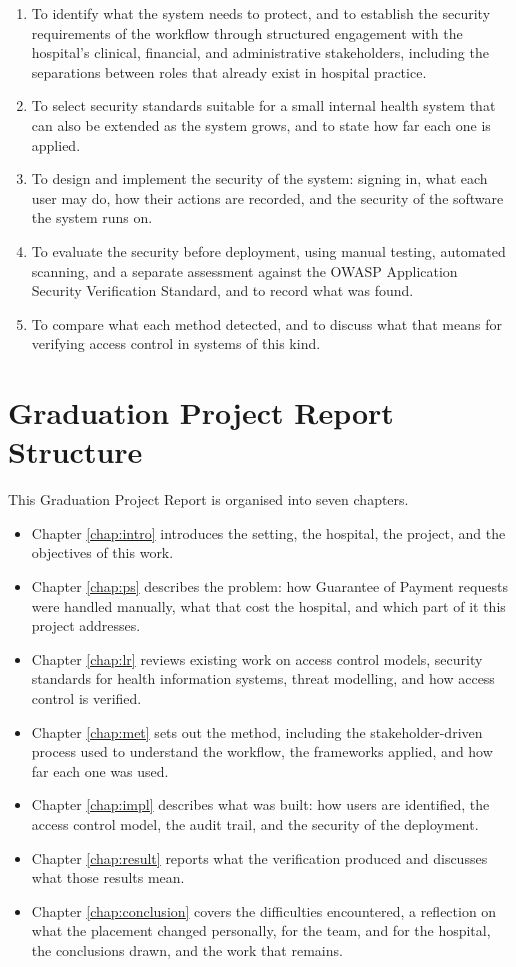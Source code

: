 \begin{enumerate}
    \item To identify what the system needs to protect, and to establish the security requirements of the workflow through structured engagement with the hospital's clinical, financial, and administrative stakeholders, including the separations between roles that already exist in hospital practice.
    \item To select security standards suitable for a small internal health system that can also be extended as the system grows, and to state how far each one is applied.
    \item To design and implement the security of the system: signing in, what each user may do, how their actions are recorded, and the security of the software the system runs on.
    \item To evaluate the security before deployment, using manual testing, automated scanning, and a separate assessment against the OWASP Application Security Verification Standard, and to record what was found.
    \item To compare what each method detected, and to discuss what that means for verifying access control in systems of this kind.
\end{enumerate}

\section{Graduation Project Report Structure}
\label{sec:intro-structure}

This Graduation Project Report is organised into seven chapters.

\begin{itemize}
    \item Chapter \ref{chap:intro} introduces the setting, the hospital, the project, and the objectives of this work.
    \item Chapter \ref{chap:ps} describes the problem: how Guarantee of Payment requests were handled manually, what that cost the hospital, and which part of it this project addresses.
    \item Chapter \ref{chap:lr} reviews existing work on access control models, security standards for health information systems, threat modelling, and how access control is verified.
    \item Chapter \ref{chap:met} sets out the method, including the stakeholder-driven process used to understand the workflow, the frameworks applied, and how far each one was used.
    \item Chapter \ref{chap:impl} describes what was built: how users are identified, the access control model, the audit trail, and the security of the deployment.
    \item Chapter \ref{chap:result} reports what the verification produced and discusses what those results mean.
    \item Chapter \ref{chap:conclusion} covers the difficulties encountered, a reflection on what the placement changed personally, for the team, and for the hospital, the conclusions drawn, and the work that remains.
\end{itemize}

